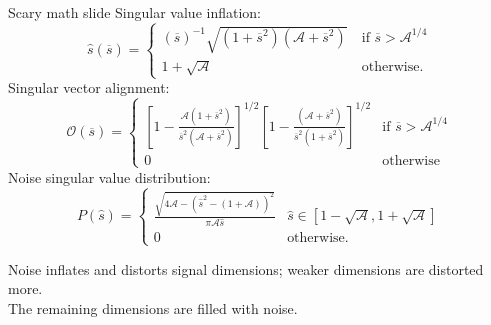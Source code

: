 \documentclass{beamer}
\begin{document}
\begin{frame}{Scary math slide}
Singular value inflation:
$$
\hat{s}(\overline{s}) = \begin{cases}
{(\overline{s})^{-1}}{\sqrt{(1+\overline{s}^2)(\mathcal{A}+\overline{s}^2)}}\ & \text{if } \overline{s} > \mathcal{A}^{1/4} \\
1+\sqrt{\mathcal{A}} & \text{otherwise}.
\end{cases}
$$
Singular vector alignment:
$$\mathcal{O}(\overline{s}) = 
\begin{cases}
\left[1-
        \frac{\mathcal{A}(1+\overline{s}^2)}          
            {\overline{s}^2(\mathcal{A}+\overline{s}^2)}
\right]^{1/2} 
\left[1-
        \frac{(\mathcal{A}+\overline{s}^2)}          
            {\overline{s}^2(1+\overline{s}^2)}
\right]^{1/2}

& \text{if } \overline{s} > \mathcal{A}^{1/4} \\
0 & \text{otherwise}
\end{cases}
$$
Noise singular value distribution:
$$P(\hat{s}) = \begin{cases}
\frac{\sqrt{4\mathcal{A}-(\hat{s}^2 - (1+\mathcal{A}))^2}}{\pi \mathcal{A}\hat{s}} & \hat{s} \in [1-\sqrt{\mathcal{A}}, 1+\sqrt{\mathcal{A}}] \\
0 & \text{otherwise}.
\end{cases}
$$
\end{frame}

\begin{frame}[standout]
Noise inflates and distorts signal dimensions; weaker dimensions are distorted more. \\[1em]
The remaining dimensions are filled with noise.
\end{frame}
\end{document}
